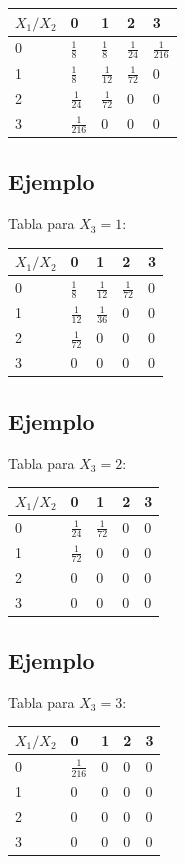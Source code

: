 \documentclass[]{book}
\begin{document}
\begin{longtable}[]{@{}lllll@{}}
\toprule
\(X_1/X_2\) & 0 & 1 & 2 & 3\tabularnewline
\midrule
\endhead
0 & \(\frac{1}{8}\) & \(\frac{1}{8}\) & \(\frac{1}{24}\) & \(\frac{1}{216}\)\tabularnewline
1 & \(\frac{1}{8}\) & \(\frac{1}{12}\) & \(\frac{1}{72}\) & \(0\)\tabularnewline
2 & \(\frac{1}{24}\) & \(\frac{1}{72}\) & \(0\) & \(0\)\tabularnewline
3 & \(\frac{1}{216}\) & \(0\) & \(0\) & \(0\)\tabularnewline
\bottomrule
\end{longtable}

\hypertarget{ejemplo-86}{%
\subsection{Ejemplo}\label{ejemplo-86}}

Tabla para \(X_3=1\):

\begin{longtable}[]{@{}lllll@{}}
\toprule
\(X_1/X_2\) & 0 & 1 & 2 & 3\tabularnewline
\midrule
\endhead
0 & \(\frac{1}{8}\) & \(\frac{1}{12}\) & \(\frac{1}{72}\) & \(0\)\tabularnewline
1 & \(\frac{1}{12}\) & \(\frac{1}{36}\) & \(0\) & \(0\)\tabularnewline
2 & \(\frac{1}{72}\) & \(0\) & \(0\) & \(0\)\tabularnewline
3 & \(0\) & \(0\) & \(0\) & \(0\)\tabularnewline
\bottomrule
\end{longtable}

\hypertarget{ejemplo-87}{%
\subsection{Ejemplo}\label{ejemplo-87}}

Tabla para \(X_3=2\):

\begin{longtable}[]{@{}lllll@{}}
\toprule
\(X_1/X_2\) & 0 & 1 & 2 & 3\tabularnewline
\midrule
\endhead
0 & \(\frac{1}{24}\) & \(\frac{1}{72}\) & \(0\) & \(0\)\tabularnewline
1 & \(\frac{1}{72}\) & \(0\) & \(0\) & \(0\)\tabularnewline
2 & \(0\) & \(0\) & \(0\) & \(0\)\tabularnewline
3 & \(0\) & \(0\) & \(0\) & \(0\)\tabularnewline
\bottomrule
\end{longtable}

\hypertarget{ejemplo-88}{%
\subsection{Ejemplo}\label{ejemplo-88}}

Tabla para \(X_3=3\):

\begin{longtable}[]{@{}lllll@{}}
\toprule
\(X_1/X_2\) & 0 & 1 & 2 & 3\tabularnewline
\midrule
\endhead
0 & \(\frac{1}{216}\) & \(0\) & \(0\) & \(0\)\tabularnewline
1 & \(0\) & \(0\) & \(0\) & \(0\)\tabularnewline
2 & \(0\) & \(0\) & \(0\) & \(0\)\tabularnewline
3 & \(0\) & \(0\) & \(0\) & \(0\)\tabularnewline
\bottomrule
\end{longtable}
\end{document}
